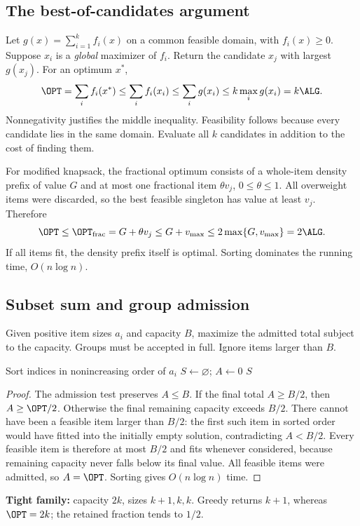 \subsection{The best-of-candidates argument}
\label{gre:best}
Let $g(x)=\sum_{i=1}^k f_i(x)$ on a common feasible domain, with $f_i(x)\ge0$.
Suppose $x_i$ is a \emph{global} maximizer of $f_i$. Return the candidate $x_j$ with
largest $g(x_j)$. For an optimum $x^*$,
\[
\OPT=\sum_i f_i(x^*)\le\sum_i f_i(x_i)
\le\sum_i g(x_i)\le k\max_i g(x_i)=k\ALG.
\]
Nonnegativity justifies the middle inequality. Feasibility follows because every candidate
lies in the same domain. Evaluate all $k$ candidates in addition to the cost of finding them.

For modified knapsack, the fractional optimum consists of a whole-item density prefix
of value $G$ and at most one fractional item $\theta v_j$, $0\le\theta\le1$. All overweight
items were discarded, so the best feasible singleton has value at least $v_j$. Therefore
\[
\OPT\le\OPT_{\rm frac}=G+\theta v_j\le G+v_{\max}
\le2\max\{G,v_{\max}\}=2\ALG.
\]
If all items fit, the density prefix itself is optimal. Sorting dominates the running time,
$O(n\log n)$.

\subsection{Subset sum and group admission}
\label{gre:subset}
Given positive item sizes $a_i$ and capacity $B$, maximize the admitted total subject to
the capacity. Groups must be accepted in full. Ignore items larger than $B$.
\begin{algorithm}[H]
\caption{Largest-first admission}
Sort indices in nonincreasing order of $a_i$\;
$S\gets\varnothing$; $A\gets0$\;
\Return $S$\;
\end{algorithm}
\begin{proof}
The admission test preserves $A\le B$. If the final total $A\ge B/2$, then
$A\ge\OPT/2$. Otherwise the final remaining capacity exceeds $B/2$.
There cannot have been a feasible item larger than $B/2$: the first such item in sorted
order would have fitted into the initially empty solution, contradicting $A<B/2$.
Every feasible item is therefore at most $B/2$ and fits whenever considered, because
remaining capacity never falls below its final value. All feasible items were admitted,
so $A=\OPT$. Sorting gives $O(n\log n)$ time.
\end{proof}
\textbf{Tight family:} capacity $2k$, sizes $k+1,k,k$. Greedy returns $k+1$, whereas
$\OPT=2k$; the retained fraction tends to $1/2$.


